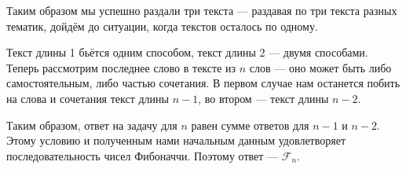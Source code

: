 \begin{itemize}
{Таким образом мы успешно раздали три текста — раздавая по три текста разных тематик, дойдём до ситуации, когда текстов осталось по одному.
} \fi

\itC Текст длины 1 бьётся одним способом, текст длины 2 — двумя способами. Теперь рассмотрим последнее слово в тексте из $n$ слов — оно может быть либо самостоятельным, либо частью сочетания. В первом случае нам останется побить на слова и сочетания текст длины $n-1$, во втором — текст длины $n-2$.

Таким образом, ответ на задачу для $n$ равен сумме ответов для $n-1$ и $n-2$. Этому условию и полученным нами начальным данным удовлетворяет последовательность чисел Фибоначчи. Поэтому ответ — $\mathcal{F}_n$.

\end{itemize}